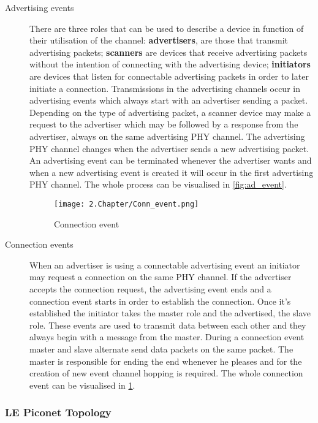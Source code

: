 \begin{description}
\item[Advertising events] There are three roles that can be used to describe a device in function of their utilisation of the channel: \textbf{advertisers}, are those that transmit advertising packets; \textbf{scanners} are devices that receive advertising packets without the intention of connecting with the advertising device; \textbf{initiators} are devices that listen for connectable advertising packets in order to later initiate a connection.
Transmissions in the advertising channels occur in advertising events which always start with an advertiser sending a packet. Depending on the type of advertising packet, a scanner device may make a request to the advertiser which may be followed by a response from the advertiser, always on the same advertising \ac{PHY} channel. The advertising \ac{PHY} channel changes when the advertiser sends a new advertising packet. An advertising event can be terminated whenever the advertiser wants and when a new advertising event is created it will  occur in the first advertising \ac{PHY} channel. The whole process can be visualised in \ref{fig:ad_event}.

\begin{figure}[H]
	\centering
		\texttt{[image: 2.Chapter/Conn\_event.png]}
	\caption[Connection Event]{Connection event}
	\label{fig:conn_event}
\end{figure}

\item[Connection events] When an advertiser is using a connectable advertising event an initiator may request a connection on the same \ac{PHY} channel. If the advertiser accepts the connection request, the advertising event ends and a connection event starts in order to establish the connection. Once it's established the initiator takes the master role and the advertised, the slave role. These events are used to transmit data between each other and they always begin with a message from the master. During a connection event master and slave alternate send data packets on the same packet. The master is responsible for ending the end whenever he pleases and for the creation of new event channel hopping is required. The whole connection event can be visualised in \ref{fig:conn_event}. 

\end{description}

\subsubsection{\ac{LE} Piconet Topology}
\label{subsec:piconet}

